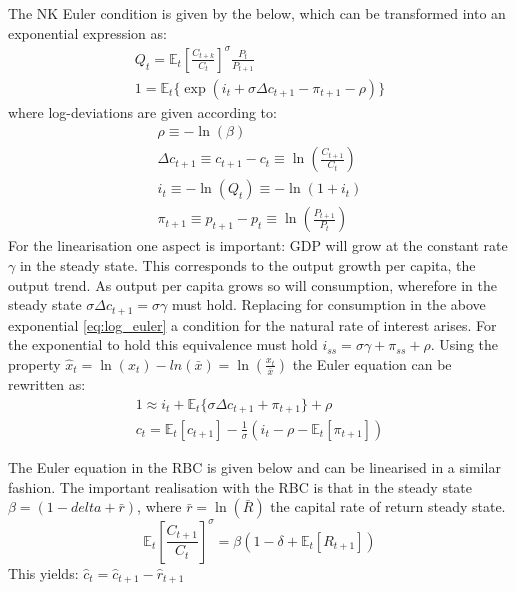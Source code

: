 \documentclass[12pt,a4paper,english]{article} %
\newcommand{\E}{\mathbb{E}} %
\begin{document}
	The NK Euler condition is given by the below, which can be transformed into an exponential expression as:
	\begin{equation}\label{eq:log_euler}
		\begin{aligned}
			Q_{t} = \E_t \left[ \frac{C_{t+k}}{C_t} \right]^\sigma \frac{P_t}{P_{t+1}} \\
			1 = \E_t \{\exp(i_t + \sigma \Delta c_{t+1} - \pi_{t+1} - \rho) \}
		\end{aligned}
	\end{equation}
	where log-deviations are given according to: 
	\begin{equation}
		\begin{aligned}
			\rho \equiv - \ln(\beta) \\
			\Delta c_{t+1} \equiv c_{t+1} - c_t \equiv \ln\left( \frac{C_{t+1}}{C_t} \right) \\
			i_t \equiv - \ln(Q_t) \equiv - \ln(1+i_t) \\
			\pi_{t+1} \equiv p_{t+1} - p_t \equiv \ln \left( \frac{P_{t+1}}{P_t} \right)
		\end{aligned}
	\end{equation}
	For the linearisation one aspect is important: GDP will grow at the constant rate $\gamma$ in the steady state. This corresponds to the output growth per capita, the output trend. As output per capita grows so will consumption, wherefore in the steady state $\sigma \Delta c_{t+1} = \sigma \gamma$ must hold. Replacing for consumption in the above exponential \eqref{eq:log_euler} a condition for the natural rate of interest arises. For the exponential to hold this equivalence must hold $i_{ss} = \sigma \gamma + \pi_{ss} + \rho$. 
	Using the property $\hat{x}_t = \ln(x_t) - ln(\bar{x}) = \ln\left(\frac{x_t}{\bar{x}}\right)$ the Euler equation can be rewritten as:
	\begin{equation}
		\begin{aligned}
			1 \approx i_t + \E_t \{\sigma \Delta c_{t+1} + \pi_{t+1} \} + \rho \\
			c_t = \E_t[c_{t+1}] - \frac{1}{\sigma} (i_t - \rho - \E_t[\pi_{t+1}])	
		\end{aligned}
	\end{equation}

	The Euler equation in the RBC is given below and can be linearised in a similar fashion. The important realisation with the RBC is that in the steady state $\beta = (1 - delta + \bar{r})$, where $\bar{r} = \ln(\bar{R})$ the capital rate of return steady state.
	\begin{equation}
		\E_t \left[ \frac{C_{t+1}}{C_t} \right]^\sigma = \beta \left(1 - \delta  + \E_t [R_{t+1}] \right)
	\end{equation}
	This yields: $\hat{c}_t = \hat{c}_{t+1} - \hat{r}_{t+1}$
\end{document}
